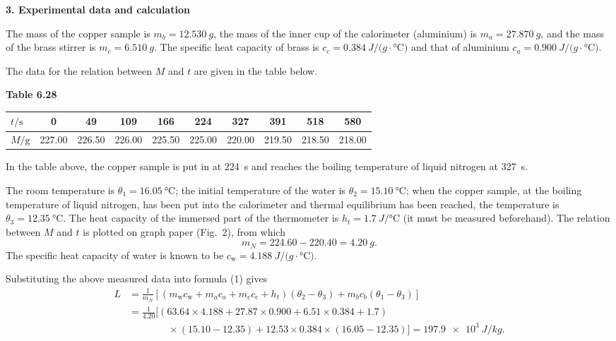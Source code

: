 \textbf{3. Experimental data and calculation}

The mass of the copper sample is $m_b=\SI{12.530}{g}$, the mass of the inner cup of the calorimeter (aluminium) is $m_a=\SI{27.870}{g}$, and the mass of the brass stirrer is $m_c=\SI{6.510}{g}$. The specific heat capacity of brass is $c_c=\SI{0.384}{J/(g\cdot\celsius)}$ and that of aluminium $c_a=\SI{0.900}{J/(g\cdot\celsius)}$.

The data for the relation between $M$ and $t$ are given in the table below.

\begin{center}
\textbf{Table 6.28}\\[3pt]
\begin{tabular}{lccccccccc}
\toprule
$t/\mathrm{s}$ & 0 & 49 & 109 & 166 & 224 & 327 & 391 & 518 & 580\\
\midrule
$M/\mathrm{g}$ & 227.00 & 226.50 & 226.00 & 225.50 & 225.00 & 220.00 & 219.50 & 218.50 & 218.00\\
\bottomrule
\end{tabular}
\end{center}
In the table above, the copper sample is put in at \SI{224}{s} and reaches the boiling temperature of liquid nitrogen at \SI{327}{s}.

The room temperature is $\theta_1=\SI{16.05}{\celsius}$; the initial temperature of the water is $\theta_2=\SI{15.10}{\celsius}$; when the copper sample, at the boiling temperature of liquid nitrogen, has been put into the calorimeter and thermal equilibrium has been reached, the temperature is $\theta_3=\SI{12.35}{\celsius}$. The heat capacity of the immersed part of the thermometer is $h_t=\SI{1.7}{J/\celsius}$ (it must be measured beforehand). The relation between $M$ and $t$ is plotted on graph paper (Fig.~2), from which
\begin{equation*}
m_N=224.60-220.40=\SI{4.20}{g}.
\end{equation*}
The specific heat capacity of water is known to be $c_{\mathrm{w}}=\SI{4.188}{J/(g\cdot\celsius)}$.

Substituting the above measured data into formula (1) gives
\begin{equation*}
\begin{aligned}
L&=\frac{1}{m_N}\left[(m_{\mathrm{w}}c_{\mathrm{w}}+m_a c_a+m_{\mathrm{c}}c_{\mathrm{c}}+h_t)(\theta_2-\theta_3)+m_bc_b(\theta_1-\theta_3)\right]\\
&=\frac{1}{4.20}\Big[(63.64\times4.188+27.87\times0.900+6.51\times0.384+1.7)\\
&\qquad\qquad\times(15.10-12.35)+12.53\times0.384\times(16.05-12.35)\Big]
=\SI{197.9e3}{J/kg}.
\end{aligned}
\end{equation*}

